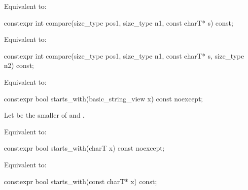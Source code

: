 \begin{itemdescr}
\pnum
\effects
Equivalent to: 
\end{itemdescr}

%
\begin{itemdecl}
constexpr int compare(size_type pos1, size_type n1, const charT* s) const;
\end{itemdecl}

\begin{itemdescr}
\pnum
\effects
Equivalent to: 
\end{itemdescr}

%
\begin{itemdecl}
constexpr int compare(size_type pos1, size_type n1, const charT* s, size_type n2) const;
\end{itemdecl}

\begin{itemdescr}
\pnum
\effects
Equivalent to: 
\end{itemdescr}

%
\begin{itemdecl}
constexpr bool starts_with(basic_string_view x) const noexcept;
\end{itemdecl}

\begin{itemdescr}
\pnum
Let  be the smaller of  and .

\pnum
\effects
Equivalent to: 
\end{itemdescr}

%
\begin{itemdecl}
constexpr bool starts_with(charT x) const noexcept;
\end{itemdecl}

\begin{itemdescr}
\pnum
\effects
Equivalent to: 
\end{itemdescr}

%
\begin{itemdecl}
constexpr bool starts_with(const charT* x) const;
\end{itemdecl}

